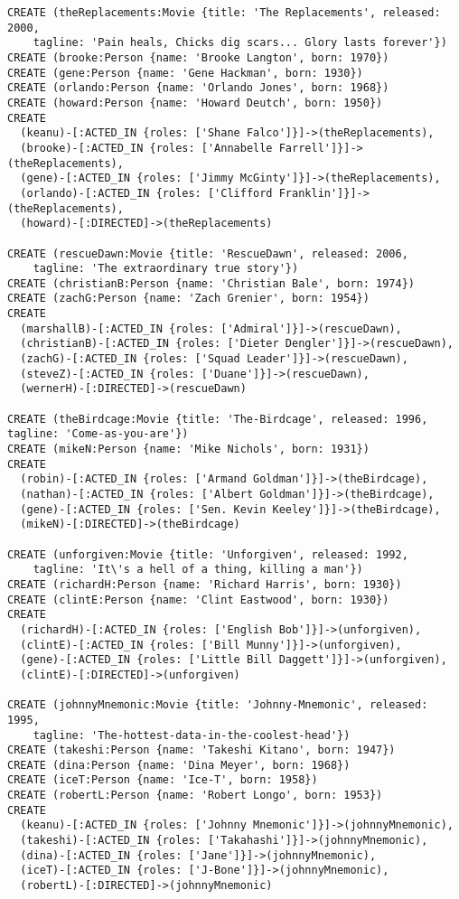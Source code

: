 \begin{lstlisting}
CREATE (theReplacements:Movie {title: 'The Replacements', released: 2000,
    tagline: 'Pain heals, Chicks dig scars... Glory lasts forever'})
CREATE (brooke:Person {name: 'Brooke Langton', born: 1970})
CREATE (gene:Person {name: 'Gene Hackman', born: 1930})
CREATE (orlando:Person {name: 'Orlando Jones', born: 1968})
CREATE (howard:Person {name: 'Howard Deutch', born: 1950})
CREATE
  (keanu)-[:ACTED_IN {roles: ['Shane Falco']}]->(theReplacements),
  (brooke)-[:ACTED_IN {roles: ['Annabelle Farrell']}]->(theReplacements),
  (gene)-[:ACTED_IN {roles: ['Jimmy McGinty']}]->(theReplacements),
  (orlando)-[:ACTED_IN {roles: ['Clifford Franklin']}]->(theReplacements),
  (howard)-[:DIRECTED]->(theReplacements)

CREATE (rescueDawn:Movie {title: 'RescueDawn', released: 2006,
    tagline: 'The extraordinary true story'})
CREATE (christianB:Person {name: 'Christian Bale', born: 1974})
CREATE (zachG:Person {name: 'Zach Grenier', born: 1954})
CREATE
  (marshallB)-[:ACTED_IN {roles: ['Admiral']}]->(rescueDawn),
  (christianB)-[:ACTED_IN {roles: ['Dieter Dengler']}]->(rescueDawn),
  (zachG)-[:ACTED_IN {roles: ['Squad Leader']}]->(rescueDawn),
  (steveZ)-[:ACTED_IN {roles: ['Duane']}]->(rescueDawn),
  (wernerH)-[:DIRECTED]->(rescueDawn)

CREATE (theBirdcage:Movie {title: 'The-Birdcage', released: 1996, tagline: 'Come-as-you-are'})
CREATE (mikeN:Person {name: 'Mike Nichols', born: 1931})
CREATE
  (robin)-[:ACTED_IN {roles: ['Armand Goldman']}]->(theBirdcage),
  (nathan)-[:ACTED_IN {roles: ['Albert Goldman']}]->(theBirdcage),
  (gene)-[:ACTED_IN {roles: ['Sen. Kevin Keeley']}]->(theBirdcage),
  (mikeN)-[:DIRECTED]->(theBirdcage)

CREATE (unforgiven:Movie {title: 'Unforgiven', released: 1992,
    tagline: 'It\'s a hell of a thing, killing a man'})
CREATE (richardH:Person {name: 'Richard Harris', born: 1930})
CREATE (clintE:Person {name: 'Clint Eastwood', born: 1930})
CREATE
  (richardH)-[:ACTED_IN {roles: ['English Bob']}]->(unforgiven),
  (clintE)-[:ACTED_IN {roles: ['Bill Munny']}]->(unforgiven),
  (gene)-[:ACTED_IN {roles: ['Little Bill Daggett']}]->(unforgiven),
  (clintE)-[:DIRECTED]->(unforgiven)

CREATE (johnnyMnemonic:Movie {title: 'Johnny-Mnemonic', released: 1995,
    tagline: 'The-hottest-data-in-the-coolest-head'})
CREATE (takeshi:Person {name: 'Takeshi Kitano', born: 1947})
CREATE (dina:Person {name: 'Dina Meyer', born: 1968})
CREATE (iceT:Person {name: 'Ice-T', born: 1958})
CREATE (robertL:Person {name: 'Robert Longo', born: 1953})
CREATE
  (keanu)-[:ACTED_IN {roles: ['Johnny Mnemonic']}]->(johnnyMnemonic),
  (takeshi)-[:ACTED_IN {roles: ['Takahashi']}]->(johnnyMnemonic),
  (dina)-[:ACTED_IN {roles: ['Jane']}]->(johnnyMnemonic),
  (iceT)-[:ACTED_IN {roles: ['J-Bone']}]->(johnnyMnemonic),
  (robertL)-[:DIRECTED]->(johnnyMnemonic)


\end{lstlisting}
